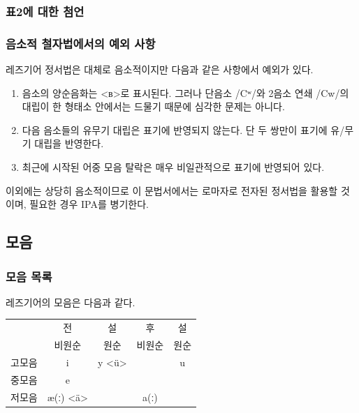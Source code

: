 \subsubsection{표2에 대한 첨언}
\omission
\subsubsection{음소적 철자법에서의 예외 사항}
레즈기어 정서법은 대체로 음소적이지만 다음과 같은 사항에서 예외가 있다.
\begin{enumerate}
	\item 음소의 양순음화는 <в>로 표시된다. 그러나 단음소 /Cʷ/와 2음소 연쇄 /Cw/의 대립이 한 형태소 안에서는 드물기 때문에 심각한 문제는 아니다.
	\item 다음 음소들의 유무기 대립은 표기에 반영되지 않는다. 단 두 쌍만이 표기에 유/무기 대립을 반영한다.
	\item 최근에 시작된 어중 모음 탈락은 매우 비일관적으로 표기에 반영되어 있다.
\end{enumerate}
이외에는 상당히 음소적이므로 이 문법서에서는 로마자로 전자된 정서법을 활용할 것이며, 필요한 경우 IPA를 병기한다.
\subsection{모음}
\subsubsection{모음 목록}
레즈기어의 모음은 다음과 같다.
\begin{tabular}{l|cc|cc}
\hline
		&전 		&설		&후 	&설\\
		&비원순		&원순	&비원순	&원순\\
고모음	&i 			&y <ü>	&		&u\\
중모음	&e  		&		&		&\\
저모음	&æ(ː) <ä>	&		&a(ː)	&\\
\end{tabular}

